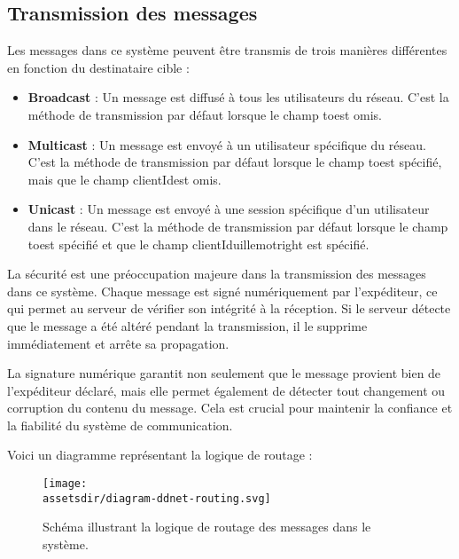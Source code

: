 \subsection{Transmission des messages}

Les messages dans ce système peuvent être transmis de trois manières différentes en fonction du destinataire cible :

\begin{itemize}
    \item \textbf{Broadcast} : Un message est diffusé à tous les utilisateurs du réseau. C'est la méthode de transmission par défaut lorsque le champ \guillemotleft to\guillemotright est omis.
    \item \textbf{Multicast} : Un message est envoyé à un utilisateur spécifique du réseau. C'est la méthode de transmission par défaut lorsque le champ \guillemotleft to\guillemotright est spécifié, mais que le champ \guillemotleft clientId\guillemotright est omis.
    \item \textbf{Unicast} : Un message est envoyé à une session spécifique d'un utilisateur dans le réseau. C'est la méthode de transmission par défaut lorsque le champ \guillemotleft to\guillemotright est spécifié et que le champ \guillemotleft clientId\guillemotright uillemotright est spécifié.
\end{itemize}

La sécurité est une préoccupation majeure dans la transmission des messages dans ce système. Chaque message est signé numériquement par l'expéditeur, ce qui permet au serveur de vérifier son intégrité à la réception. Si le serveur détecte que le message a été altéré pendant la transmission, il le supprime immédiatement et arrête sa propagation.

La signature numérique garantit non seulement que le message provient bien de l'expéditeur déclaré, mais elle permet également de détecter tout changement ou corruption du contenu du message. Cela est crucial pour maintenir la confiance et la fiabilité du système de communication.

Voici un diagramme représentant la logique de routage :

\begin{figure}[H]
    \begin{center}
        \texttt{[image: \\assetsdir/diagram-ddnet-routing.svg]}
    \end{center}
    \caption[Logique de Routage des Messages]{Schéma illustrant la logique de routage des messages dans le système.}
\end{figure}


